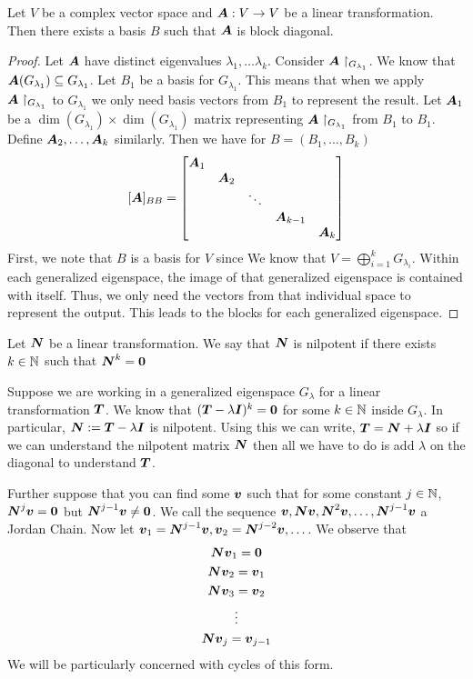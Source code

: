 \begin{theorem}
    Let $V$ be a complex vector space and $\boldsymbol{A}:V\to V$ be a linear transformation. Then there exists a basis $B$ such that $\boldsymbol{A}$ is block diagonal.
\end{theorem}

\begin{proof}
    Let $\boldsymbol{A}$ have distinct eigenvalues $\lambda_1,\dots\lambda_k$. Consider $\boldsymbol{A}\restriction_{G_{\lambda_1}}$. We know that $\boldsymbol{A}(G_{\lambda_1})\subseteq G_{\lambda_1}$. Let $B_1$ be a basis for $G_{\lambda_1}$. This means that when we apply $\boldsymbol{A}\restriction_{G_{\lambda_1}}$ to $G_{\lambda_1}$ we only need basis vectors from $B_1$ to represent the result. Let $\boldsymbol{A}_1$ be a $\dim(G_{\lambda_1})\times\dim(G_{\lambda_1})$ matrix representing $\boldsymbol{A}\restriction_{G_{\lambda_1}}$ from $B_1$ to $B_1$. Define $\boldsymbol{A}_2,\dots,\boldsymbol{A}_k$ similarly. Then we have for $B=(B_1,\dots,B_k)$
    \[
    [\boldsymbol{A}]_{BB}=\begin{bmatrix}
        \boldsymbol{A}_1 & & & \\
        & \boldsymbol{A}_2 & & \\
        & & \ddots & \\
        & & & \boldsymbol{A}_{k-1} & \\
        & & & & \boldsymbol{A}_k
    \end{bmatrix}
    \]
    First, we note that $B$ is a basis for $V$ since We know that $V=\bigoplus_{i=1}^k G_{\lambda_i}$. Within each generalized eigenspace, the image of that generalized eigenspace is contained with itself. Thus, we only need the vectors from that individual space to represent the output. This leads to the blocks for each generalized eigenspace.
\end{proof}

\begin{definition}
    Let $\boldsymbol{N}$ be a linear transformation. We say that $\boldsymbol{N}$ is nilpotent if there exists $k\in\mathbb{N}$ such that $\boldsymbol{N}^k=\boldsymbol{0}$
\end{definition}
Suppose we are working in a generalized eigenspace $G_{\lambda}$ for a linear transformation $\boldsymbol{T}$. We know that $(\boldsymbol{T}-\lambda\boldsymbol{I})^k=\boldsymbol{0}$ for some $k\in\mathbb{N}$ inside $G_{\lambda}$. In particular, $\boldsymbol{N}:=\boldsymbol{T}-\lambda\boldsymbol{I}$ is nilpotent. Using this we can write, $\boldsymbol{T}=\boldsymbol{N}+\lambda\boldsymbol{I}$ so if we can understand the nilpotent matrix $\boldsymbol{N}$ then all we have to do is add $\lambda$ on the diagonal to understand $\boldsymbol{T}$.

Further suppose that you can find some $\boldsymbol{v}$ such that for some constant $j\in\mathbb{N}$, $\boldsymbol{N}^j\boldsymbol{v}=\boldsymbol{0}$ but $\boldsymbol{N}^{j-1}\boldsymbol{v}\neq\boldsymbol{0}$. We call the sequence $\boldsymbol{v},\boldsymbol{N}\boldsymbol{v},\boldsymbol{N}^2\boldsymbol{v},\dots,\boldsymbol{N}^{j-1}\boldsymbol{v}$ a Jordan Chain. Now let $\boldsymbol{v}_1=\boldsymbol{N}^{j-1}\boldsymbol{v},\boldsymbol{v}_2=\boldsymbol{N}^{j-2}\boldsymbol{v},\dots$. We observe that
\begin{gather*}
    \boldsymbol{N}\boldsymbol{v}_1=\boldsymbol{0}\\
    \boldsymbol{N}\boldsymbol{v}_2=\boldsymbol{v}_1\\
    \boldsymbol{N}\boldsymbol{v}_3=\boldsymbol{v}_2\\
    \vdots\\
    \boldsymbol{N}\boldsymbol{v}_j=\boldsymbol{v}_{j-1}
\end{gather*}
We will be particularly concerned with cycles of this form.

